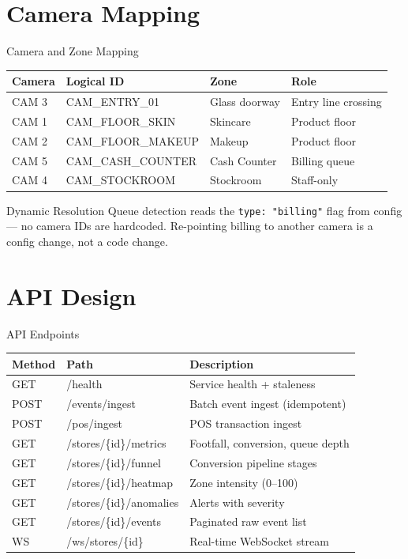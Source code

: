 \documentclass[aspectratio=169, 11pt]{beamer}
\begin{document}
\section{Camera Mapping}

\begin{frame}{Camera and Zone Mapping}
  \centering
  \begin{tabular}{llll}
    \toprule
    \textbf{Camera} & \textbf{Logical ID} & \textbf{Zone} & \textbf{Role} \\
    \midrule
    CAM 3 & CAM\_ENTRY\_01 & Glass doorway & Entry line crossing \\
    CAM 1 & CAM\_FLOOR\_SKIN & Skincare & Product floor \\
    CAM 2 & CAM\_FLOOR\_MAKEUP & Makeup & Product floor \\
    CAM 5 & CAM\_CASH\_COUNTER & Cash Counter & Billing queue \\
    CAM 4 & CAM\_STOCKROOM & Stockroom & Staff-only \\
    \bottomrule
  \end{tabular}

  \vspace{0.5cm}
  \begin{block}{Dynamic Resolution}
    Queue detection reads the \texttt{type: "billing"} flag from config ---
    no camera IDs are hardcoded. Re-pointing billing to another camera is
    a config change, not a code change.
  \end{block}
\end{frame}

\section{API Design}

\begin{frame}{API Endpoints}
  \centering
  \small
  \begin{tabular}{lll}
    \toprule
    \textbf{Method} & \textbf{Path} & \textbf{Description} \\
    \midrule
    GET & /health & Service health + staleness \\
    POST & /events/ingest & Batch event ingest (idempotent) \\
    POST & /pos/ingest & POS transaction ingest \\
    GET & /stores/\{id\}/metrics & Footfall, conversion, queue depth \\
    GET & /stores/\{id\}/funnel & Conversion pipeline stages \\
    GET & /stores/\{id\}/heatmap & Zone intensity (0--100) \\
    GET & /stores/\{id\}/anomalies & Alerts with severity \\
    GET & /stores/\{id\}/events & Paginated raw event list \\
    WS & /ws/stores/\{id\} & Real-time WebSocket stream \\
    \bottomrule
  \end{tabular}
\end{frame}
\end{document}
